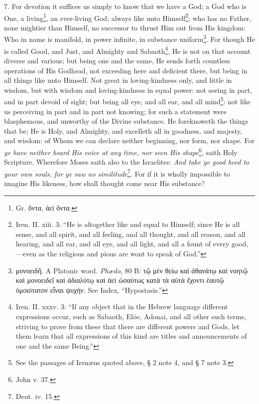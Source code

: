 7. For devotion it suffices us simply to know that we have a God; a God who is One, a living\footnote{Gr. \textgreek{ὄντα, ἀεὶ ὄντα}.}, an ever-living God; always like unto Himself\footnote{Iren. II. xiii. 3: “He is altogether like and equal to Himself; since He is all sense, and all spirit, and all feeling, and all thought, and all reason, and all hearing, and all ear, and all eye, and all light, and all a fount of every good,—even as the religious and pious are wont to speak of God.”}; who has no Father, none mightier than Himself, no successor to thrust Him out from His kingdom: Who in name is manifold, in power infinite, in substance uniform\footnote{\textgreek{μονοειδῆ}. A Platonic word. \emph{Phædo}, 80 B: \textgreek{τῷ μὲν θείω καὶ ἀθανάτῳ καὶ νοητῷ καὶ μονοειδεῖ καὶ ἀδιαλύτῳ καὶ ἀεὶ ὡσαύτως κατὰ τὰ αὐτὰ ἔχοντι ἑαυτῷ ὁμοιότατον εἶναι ψυχήν}. See Index, “Hypostasis.”}. For though He is called Good, and Just, and Almighty and Sabaoth\footnote{Iren. II. xxxv. 3: “If any object that in the Hebrew language different expressions occur, such as Sabaoth, Elöe, Adonai, and all other such terms, striving to prove from these that there are different powers and Gods, let them learn that all expressions of this kind are titles and announcements of one and the same Being.”}, He is not on that account diverse and various; but being one and the same, He sends forth countless operations of His Godhead, not exceeding here and deficient there, but being in all things like unto Himself. Not great in loving-kindness only, and little in wisdom, but with wisdom and loving-kindness in equal power: not seeing in part, and in part devoid of sight; but being all eye, and all ear, and all mind\footnote{See the passages of Irenæus quoted above, § 2 note 4, and § 7 note 3.}: not like us perceiving in part and in part not knowing; for such a statement were blasphemous, and unworthy of the Divine substance. He foreknoweth the things that be; He is Holy, and Almighty, and excelleth all in goodness, and majesty, and wisdom: of Whom we can declare neither beginning, nor form, nor shape. For \emph{ye have neither heard His voice at any time, nor seen His shape}\footnote{John v. 37.}, saith Holy Scripture. Wherefore Moses saith also to the Israelites: \emph{And take ye good heed to your own souls, for ye saw no similitude}\footnote{Deut. iv. 15.}. For if it is wholly impossible to imagine His likeness, how shall thought come near His substance?

